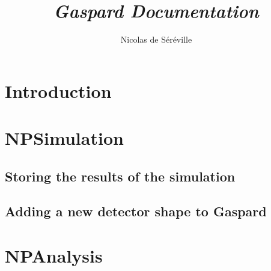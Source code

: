 \documentclass[a4paper,12pt]{article}
\begin{document}
\title{\emph{Gaspard Documentation}}
\author{Nicolas de S\'er\'eville}

\maketitle 
\pagebreak
\tableofcontents %
\pagebreak


\section{Introduction}
\section{NPSimulation}
\subsection{}
\subsection{Storing the results of the simulation}
\subsection{Adding a new detector shape to Gaspard}

\section{NPAnalysis}
\end{document}
